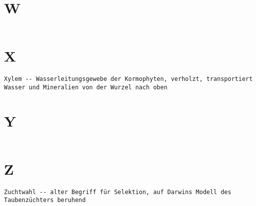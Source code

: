 \documentclass{article}
\begin{document}
\section{W}
\begin{verbatim}

\end{verbatim}
\newpage


\section{X}
\begin{verbatim}
Xylem -- Wasserleitungsgewebe der Kormophyten, verholzt, transportiert Wasser und Mineralien von der Wurzel nach oben

\end{verbatim}
\newpage


\section{Y}
\begin{verbatim}

\end{verbatim}
\newpage


\section{Z}
\begin{verbatim}
Zuchtwahl -- alter Begriff für Selektion, auf Darwins Modell des Taubenzüchters beruhend

\end{verbatim}
\newpage
\end{document}
